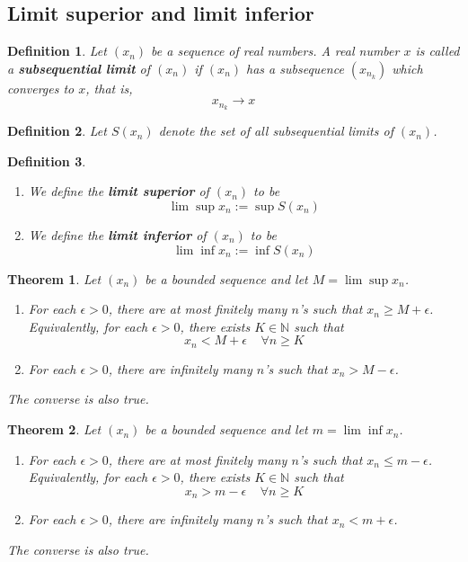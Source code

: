 \documentclass[8pt]{article}
\newtheorem{definition}{Definition}[section]
\newtheorem{theorem}{Theorem}[section]
\theoremstyle{definition}
\begin{document}
\subsection{Limit superior and limit inferior}
\begin{definition}\normalfont Let $(x_n)$ be a sequence of real numbers. A real number $x$ is called a \textbf{subsequential limit} of $(x_n)$ if $(x_n)$ has a subsequence $(x_{n_k})$ which converges to $x$, that is,
\[
x_{n_k}\to x
\]
\end{definition}
\begin{definition}\normalfont Let $S(x_n)$ denote the set of all subsequential limits of $(x_n)$.
\end{definition}
\begin{definition}\normalfont
\begin{enumerate}
\item We define the \textbf{limit superior} of $(x_n)$ to be
\[
\lim\sup x_n:=\sup S(x_n)
\]
\item We define the \textbf{limit inferior} of $(x_n)$ to be
\[
\lim\inf x_n:=\inf S(x_n)
\]
\end{enumerate}
\end{definition}
\begin{theorem}\normalfont Let $(x_n)$ be a bounded sequence and let $M = \lim\sup x_n$.
\begin{enumerate}
\item For each $\epsilon>0$, there are at most finitely many $n$'s such that $x_n\geq M+\epsilon$.\\
Equivalently, for each $\epsilon>0$, there exists $K\in\mathbb{N}$ such that
\[
x_n<M+\epsilon\;\;\;\;\forall n\geq K
\]
\item For each $\epsilon>0$, there are infinitely many $n$'s such that $x_n> M-\epsilon$.
\end{enumerate}
The converse is also true.
\end{theorem}
\begin{theorem}\normalfont Let $(x_n)$ be a bounded sequence and let $m = \lim\inf x_n$.
\begin{enumerate}
\item For each $\epsilon>0$, there are at most finitely many $n$'s such that $x_n\leq m-\epsilon$.\\
Equivalently, for each $\epsilon>0$, there exists $K\in\mathbb{N}$ such that
\[
x_n>m-\epsilon\;\;\;\;\forall n\geq K
\]
\item For each $\epsilon>0$, there are infinitely many $n$'s such that $x_n< m+\epsilon$.
\end{enumerate}
The converse is also true.
\end{theorem}
\end{document}
